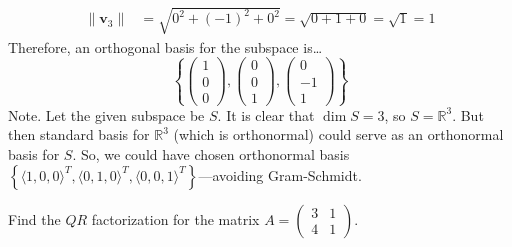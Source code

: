 \documentclass[12pt,letterpaper]{exam}
\begin{document}
\begin{questions}
{\[\begin{aligned}
	\| \mathbf{v}_3 \|&= \sqrt{0^2 + (-1)^2 + 0^2}= \sqrt{0 + 1 + 0}= \sqrt{1}= 1
	\end{aligned}
	\]
Therefore, an orthogonal basis for the subspace is\dots
	\[
	\boxed{\left\{ \begin{pmatrix} 1 \\ 0 \\ 0 \end{pmatrix}, \begin{pmatrix} 0 \\ 0 \\ 1 \end{pmatrix}, \begin{pmatrix} 0 \\ -1 \\[0.15cm] 1 \end{pmatrix} \right\}}
	\]
\tiny Note. Let the given subspace be $S$. It is clear that $\dim S= 3$, so $S= \mathbb{R}^3$. But then standard basis for $\mathbb{R}^3$ (which is orthonormal) could serve as an orthonormal basis for $S$. So, we could have chosen orthonormal basis $\left\{ \langle 1, 0, 0 \rangle^T, \langle 0, 1, 0 \rangle^T, \langle 0, 0, 1 \rangle^T \right\}$---avoiding Gram-Schmidt.}



\newpage
\question[10] Find the $QR$ factorization for the matrix $A= \begin{pmatrix} 3 & 1 \\ 4 & 1 \end{pmatrix}$.\pspace


\end{questions}
\end{document}

